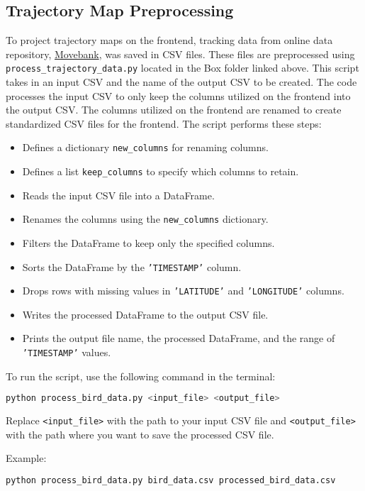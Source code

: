 \documentclass{article}
\begin{document}
\subsection{Trajectory Map Preprocessing}
To project trajectory maps on the frontend, tracking data from online data repository, \href{https://www.movebank.org/cms/movebank-main} {Movebank}, was saved in CSV files. These files are preprocessed using \texttt{process\_trajectory\_data.py} located in the Box folder linked above. This script takes in an input CSV and the name of the output CSV to be created.
The code processes the input CSV to only keep the columns utilized on the frontend into the output CSV. The columns utilized on the frontend are renamed to create standardized CSV files for the frontend. The script performs these steps:
\begin{itemize}
    \item Defines a dictionary \texttt{new\_columns} for renaming columns.
    \item Defines a list \texttt{keep\_columns} to specify which columns to retain.
    \item Reads the input CSV file into a DataFrame.
    \item Renames the columns using the \texttt{new\_columns} dictionary.
    \item Filters the DataFrame to keep only the specified columns.
    \item Sorts the DataFrame by the \texttt{'TIMESTAMP'} column.
    \item Drops rows with missing values in \texttt{'LATITUDE'} and \texttt{'LONGITUDE'} columns.
    \item Writes the processed DataFrame to the output CSV file.
    \item Prints the output file name, the processed DataFrame, and the range of \texttt{'TIMESTAMP'} values.
\end{itemize}

To run the script, use the following command in the terminal:

\begin{lstlisting}[language=bash]
python process_bird_data.py <input_file> <output_file>
\end{lstlisting}

Replace \texttt{<input\_file>} with the path to your input CSV file and \texttt{<output\_file>} with the path where you want to save the processed CSV file.

Example:

\begin{lstlisting}[language=bash]
python process_bird_data.py bird_data.csv processed_bird_data.csv
\end{lstlisting}
\end{document}
